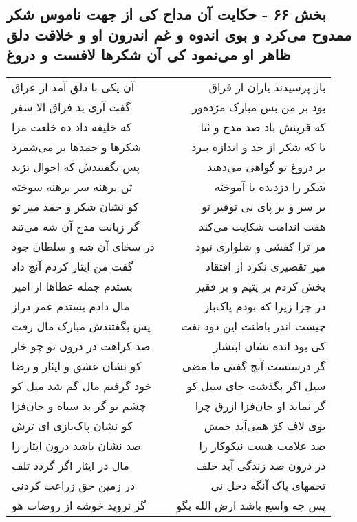 \begin{center}
\section*{بخش ۶۶ - حکایت آن مداح کی از جهت ناموس شکر ممدوح می‌کرد و بوی اندوه و غم اندرون او و خلاقت دلق ظاهر او می‌نمود کی آن  شکرها لافست و دروغ}
\label{sec:sh066}
\begin{longtable}{l p{0.5cm} r}
آن یکی با دلق آمد از عراق
&&
باز پرسیدند یاران از فراق
\\
گفت آری بد فراق الا سفر
&&
بود بر من بس مبارک مژده‌ور
\\
که خلیفه داد ده خلعت مرا
&&
که قرینش باد صد مدح و ثنا
\\
شکرها و حمدها بر می‌شمرد
&&
تا که شکر از حد و اندازه ببرد
\\
پس بگفتندش که احوال نژند
&&
بر دروغ تو گواهی می‌دهند
\\
تن برهنه سر برهنه سوخته
&&
شکر را دزدیده یا آموخته
\\
کو نشان شکر و حمد میر تو
&&
بر سر و بر پای بی توفیر تو
\\
گر زبانت مدح آن شه می‌تند
&&
هفت اندامت شکایت می‌کند
\\
در سخای آن شه و سلطان جود
&&
مر ترا کفشی و شلواری نبود
\\
گفت من ایثار کردم آنچ داد
&&
میر تقصیری نکرد از افتقاد
\\
بستدم جمله عطاها از امیر
&&
بخش کردم بر یتیم و بر فقیر
\\
مال دادم بستدم عمر دراز
&&
در جزا زیرا که بودم پاک‌باز
\\
پس بگفتندش مبارک مال رفت
&&
چیست اندر باطنت این دود نفت
\\
صد کراهت در درون تو چو خار
&&
کی بود انده نشان ابتشار
\\
کو نشان عشق و ایثار و رضا
&&
گر درستست آنچ گفتی ما مضی
\\
خود گرفتم مال گم شد میل کو
&&
سیل اگر بگذشت جای سیل کو
\\
چشم تو گر بد سیاه و جان‌فزا
&&
گر نماند او جان‌فزا ازرق چرا
\\
کو نشان پاک‌بازی ای ترش
&&
بوی لاف کژ همی‌آید خمش
\\
صد نشان باشد درون ایثار را
&&
صد علامت هست نیکوکار را
\\
مال در ایثار اگر گردد تلف
&&
در درون صد زندگی آید خلف
\\
در زمین حق زراعت کردنی
&&
تخمهای پاک آنگه دخل نی
\\
گر نروید خوشه از روضات هو
&&
پس چه واسع باشد ارض الله بگو

\end{longtable}
\end{center}
